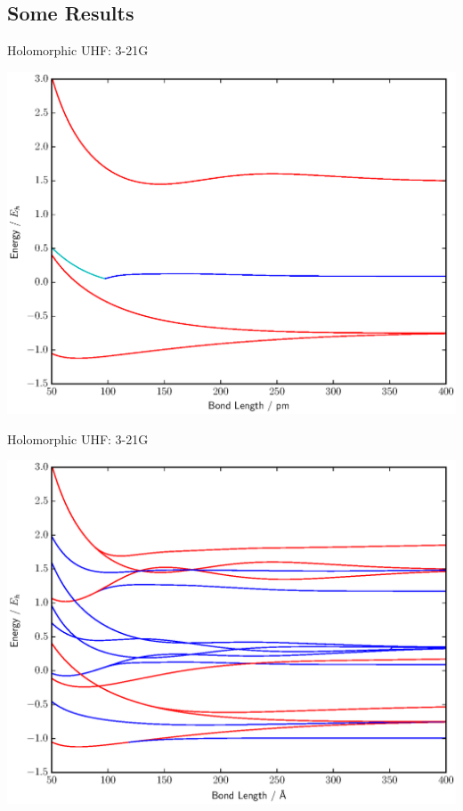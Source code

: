 \documentclass{beamer}
\begin{document}
\subsection{Some Results}
\begin{frame}{Holomorphic UHF:  3-21G}
\vspace{-0.9em}
  \begin{center}
    \includegraphics[scale=0.45]{BFGS_stand_UHF_HH_3-21g}
  \end{center}
\end{frame}

\begin{frame}{Holomorphic UHF:  3-21G}
\vspace{-0.9em}
  \begin{center}
    \includegraphics[scale=0.45]{BFGS_UHF_HH_3-21g}
  \end{center}
\end{frame}
\end{document}
